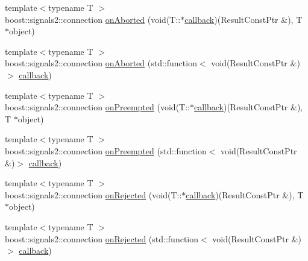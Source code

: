 \begin{DoxyCompactItemize}
\item 
{\footnotesize template$<$typename T $>$ }\\boost\+::signals2\+::connection \hyperlink{classsmacc_1_1client__bases_1_1SmaccActionClientBase_a75c58162621a705bfd11efdf068eb06b}{on\+Aborted} (void(T\+::$\ast$\hyperlink{sm__ridgeback__barrel__search__2_2servers_2opencv__perception__node_2opencv__perception__node_8cpp_a050e697bd654facce10ea3f6549669b3}{callback})(Result\+Const\+Ptr \&), T $\ast$object)
\item 
{\footnotesize template$<$typename T $>$ }\\boost\+::signals2\+::connection \hyperlink{classsmacc_1_1client__bases_1_1SmaccActionClientBase_a67661e9415e2f2c2a1fede92a1b3dd1d}{on\+Aborted} (std\+::function$<$ void(Result\+Const\+Ptr \&)$>$ \hyperlink{sm__ridgeback__barrel__search__2_2servers_2opencv__perception__node_2opencv__perception__node_8cpp_a050e697bd654facce10ea3f6549669b3}{callback})
\item 
{\footnotesize template$<$typename T $>$ }\\boost\+::signals2\+::connection \hyperlink{classsmacc_1_1client__bases_1_1SmaccActionClientBase_a7b11af8b2fe1cf75dead6c3a90baefe2}{on\+Preempted} (void(T\+::$\ast$\hyperlink{sm__ridgeback__barrel__search__2_2servers_2opencv__perception__node_2opencv__perception__node_8cpp_a050e697bd654facce10ea3f6549669b3}{callback})(Result\+Const\+Ptr \&), T $\ast$object)
\item 
{\footnotesize template$<$typename T $>$ }\\boost\+::signals2\+::connection \hyperlink{classsmacc_1_1client__bases_1_1SmaccActionClientBase_a2941fe4e9a24a7862fd1cfbc63cbfcfa}{on\+Preempted} (std\+::function$<$ void(Result\+Const\+Ptr \&)$>$ \hyperlink{sm__ridgeback__barrel__search__2_2servers_2opencv__perception__node_2opencv__perception__node_8cpp_a050e697bd654facce10ea3f6549669b3}{callback})
\item 
{\footnotesize template$<$typename T $>$ }\\boost\+::signals2\+::connection \hyperlink{classsmacc_1_1client__bases_1_1SmaccActionClientBase_a4a0f2dc95e6fbc7f25821f57e23b7905}{on\+Rejected} (void(T\+::$\ast$\hyperlink{sm__ridgeback__barrel__search__2_2servers_2opencv__perception__node_2opencv__perception__node_8cpp_a050e697bd654facce10ea3f6549669b3}{callback})(Result\+Const\+Ptr \&), T $\ast$object)
\item 
{\footnotesize template$<$typename T $>$ }\\boost\+::signals2\+::connection \hyperlink{classsmacc_1_1client__bases_1_1SmaccActionClientBase_af6f191d1b1612d57082aa278db1f7be4}{on\+Rejected} (std\+::function$<$ void(Result\+Const\+Ptr \&)$>$ \hyperlink{sm__ridgeback__barrel__search__2_2servers_2opencv__perception__node_2opencv__perception__node_8cpp_a050e697bd654facce10ea3f6549669b3}{callback})

\end{DoxyCompactItemize}
